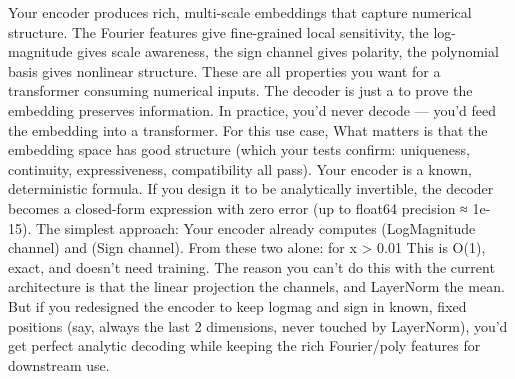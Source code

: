 {}\markdownRendererSectionBegin
{}\markdownRendererInterblockSeparator
{} Your encoder produces rich, multi-scale embeddings that capture numerical structure. The Fourier features give fine-grained local sensitivity, the log-magnitude gives scale awareness, the sign channel gives polarity, the polynomial basis gives nonlinear structure. These are all properties you want for a transformer consuming numerical inputs.\markdownRendererParagraphSeparator
{}The decoder is just a  to prove the embedding preserves information. In practice, you'd never decode — you'd feed the embedding into a transformer. For this use case,  What matters is that the embedding space has good structure (which your tests confirm: uniqueness, continuity, expressiveness, compatibility all pass).\markdownRendererInterblockSeparator
{}
\markdownRendererSectionEnd \markdownRendererSectionBegin
{}\markdownRendererInterblockSeparator
{} Your encoder is a known, deterministic formula. If you design it to be analytically invertible, the decoder becomes a closed-form expression with zero error (up to float64 precision ≈ 1e-15).\markdownRendererParagraphSeparator
{}The simplest approach:  Your encoder already computes  (LogMagnitude channel) and  (Sign channel). From these two alone:\markdownRendererInterblockSeparator
{}\markdownRendererUlBeginTight
\markdownRendererUlItem {}\markdownRendererUlItemEnd 
\markdownRendererUlItem {} for \markdownRendererPipe{}x\markdownRendererPipe{} > \markdownRendererTilde{}0.01\markdownRendererUlItemEnd 
\markdownRendererUlItem {}\markdownRendererUlItemEnd 
\markdownRendererUlEndTight \markdownRendererInterblockSeparator
{}This is O(1), exact, and doesn't need training. The reason you can't do this with the current architecture is that the linear projection  the channels, and LayerNorm  the mean. But if you redesigned the encoder to keep log\markdownRendererUnderscore{}mag and sign in known, fixed positions (say, always the last 2 dimensions, never touched by LayerNorm), you'd get perfect analytic decoding while keeping the rich Fourier/poly features for downstream use.\markdownRendererInterblockSeparator
